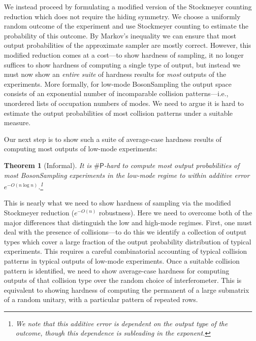 \documentclass[11pt]{article}
\theoremstyle{plain}
\theoremstyle{plain}
\theoremstyle{plain}
\newtheorem{thm}{Theorem}
\theoremstyle{plain}
\theoremstyle{plain}
\theoremstyle{plain}
\theoremstyle{plain}
\theoremstyle{remark}
\theoremstyle{remark}
\theoremstyle{plain}
\theoremstyle{plain}
\theoremstyle{plain}
\theoremstyle{plain}
\newcommand{\sharP}{\#\mathsf{P}}
\begin{document}
We instead proceed by formulating a modified version of the Stockmeyer counting reduction which does not require the hiding symmetry.  We choose a uniformly random outcome of the experiment and use Stockmeyer counting to estimate the probability of this outcome. 
By Markov's inequality we can ensure that most output probabilities of the approximate sampler are mostly correct. However, this modified reduction comes at a cost---to show hardness of sampling, it no longer suffices to show hardness of computing a single type of output, but instead we must now show an \emph{entire suite} of hardness results for \emph{most} outputs of the experiments. More formally, for low-mode BosonSampling the output space consists of an exponential number of incomparable collision patterns---i.e., unordered lists of occupation numbers of modes. We need to argue it is hard to estimate the output probabilities of most collision patterns under a suitable measure. 

Our next step is to show such a suite of average-case hardness results of computing most outputs of low-mode experiments:
\begin{thm}[Informal] \label{thm:maininformal} It is $\sharP$-hard to compute most output probabilities of most BosonSampling experiments  in the low-mode regime to within additive error $e^{-O(n\log n)}$.\footnote{We note that this additive error is dependent on the output type of the outcome, though this dependence is subleading in the exponent.} 
\end{thm}This is nearly what we need to show hardness of sampling via the modified Stockmeyer reduction ($e^{-O(n)}$ robustness).
Here we need to overcome both of the major differences that distinguish the low and high-mode regimes.  First, one must deal with the presence of collisions---to do this we identify a collection of output types which cover a large fraction of the output probability distribution of typical experiments. This requires a careful combinatorial accounting of typical collision patterns in typical outputs of low-mode experiments. Once a suitable collision pattern is identified, we need to show average-case hardness for computing outputs of that collision type over the random choice of interferometer. This is equivalent to showing hardness of computing the permanent of a large submatrix of a random unitary, with a particular pattern of repeated rows. 
\end{document}
